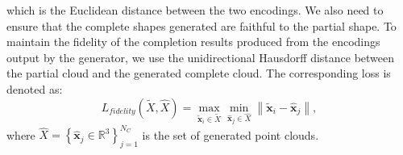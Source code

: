         which is the Euclidean distance between the two encodings. We also need to ensure that the complete shapes generated are faithful to the partial shape. To maintain the fidelity of the completion results produced from the encodings output by the generator, we use the unidirectional Hausdorff distance between the partial cloud and the generated complete cloud. The corresponding loss is denoted as:
        \begin{equation}\label{fidelity_loss}
            L_{fidelity}(\tilde{X}, \hat{X}) = \max_{\mathbf{\tilde{x}}_{i} \in \tilde{X}} \min_{\mathbf{\hat{x}}_{j} \in \hat{X}} \left\|\mathbf{\tilde{x}}_{i}-\mathbf{\hat{x}}_{j}\right\|,
        \end{equation}
        where $\hat{X}=\left\{\mathbf{\hat{x}}_{j} \in \mathbb{R}^{3}\right\}_{j=1}^{N_C}$ is the set of generated point clouds.




